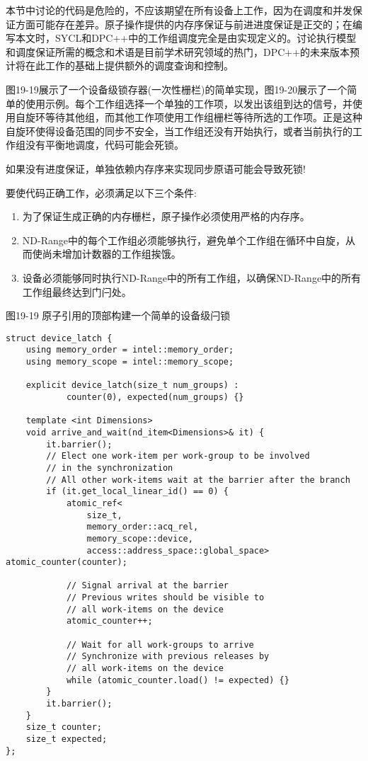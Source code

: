 本节中讨论的代码是危险的，不应该期望在所有设备上工作，因为在调度和并发保证方面可能存在差异。原子操作提供的内存序保证与前进进度保证是正交的；在编写本文时，SYCL和DPC++中的工作组调度完全是由实现定义的。讨论执行模型和调度保证所需的概念和术语是目前学术研究领域的热门，DPC++的未来版本预计将在此工作的基础上提供额外的调度查询和控制。\par

图19-19展示了一个设备级锁存器(一次性栅栏)的简单实现，图19-20展示了一个简单的使用示例。每个工作组选择一个单独的工作项，以发出该组到达的信号，并使用自旋环等待其他组，而其他工作项使用工作组栅栏等待所选的工作项。正是这种自旋环使得设备范围的同步不安全，当工作组还没有开始执行，或者当前执行的工作组没有平衡地调度，代码可能会死锁。\par

\begin{tcolorbox}[colback=red!5!white,colframe=red!75!black]
如果没有进度保证，单独依赖内存序来实现同步原语可能会导致死锁!
\end{tcolorbox}

要使代码正确工作，必须满足以下三个条件:\par

\begin{enumerate}
	\item 为了保证生成正确的内存栅栏，原子操作必须使用严格的内存序。
	\item ND-Range中的每个工作组必须能够执行，避免单个工作组在循环中自旋，从而使尚未增加计数器的工作组挨饿。
	\item 设备必须能够同时执行ND-Range中的所有工作组，以确保ND-Range中的所有工作组最终达到门闩处。
\end{enumerate}

\hspace*{\fill} \par %
图19-19 原子引用的顶部构建一个简单的设备级闩锁
\begin{lstlisting}[caption={}]
struct device_latch {
	using memory_order = intel::memory_order;
	using memory_scope = intel::memory_scope;
	
	explicit device_latch(size_t num_groups) :
			counter(0), expected(num_groups) {}
			
	template <int Dimensions>
	void arrive_and_wait(nd_item<Dimensions>& it) {
		it.barrier();
		// Elect one work-item per work-group to be involved
		// in the synchronization
		// All other work-items wait at the barrier after the branch
		if (it.get_local_linear_id() == 0) {
			atomic_ref<
				size_t,
				memory_order::acq_rel,
				memory_scope::device,
				access::address_space::global_space> atomic_counter(counter);
				
			// Signal arrival at the barrier
			// Previous writes should be visible to 
			// all work-items on the device
			atomic_counter++;
			
			// Wait for all work-groups to arrive
			// Synchronize with previous releases by
			// all work-items on the device
			while (atomic_counter.load() != expected) {}
		}
		it.barrier();
	}
	size_t counter;
	size_t expected;
};
\end{lstlisting}

